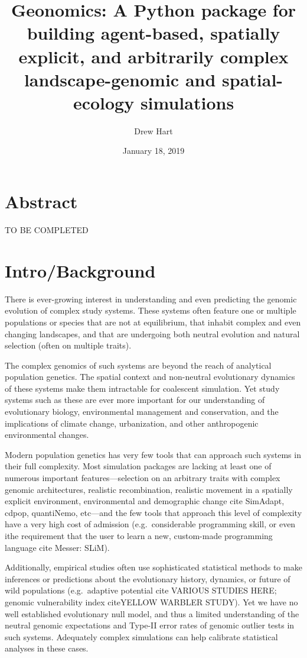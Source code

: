 ﻿\documentclass{article}
\title{Geonomics: A Python package for building agent-based, spatially explicit, and arbitrarily complex landscape-genomic and spatial-ecology simulations}
\author{Drew Hart}
\date{January 18, 2019}
\begin{document}
\maketitle

\section{Abstract}

{\LARGE TO BE COMPLETED}


\section{Intro/Background}
There is ever-growing interest in understanding and even predicting
the genomic evolution of complex study systems. 
These systems often feature one or multiple populations or species that are not
at equilibrium, that inhabit complex and even changing landscapes, and that are 
undergoing both neutral evolution and natural selection (often on multiple traits).

The complex genomics of such systems are beyond the reach of analytical
population genetics. The spatial context and non-neutral evolutionary
dynamics of these systems make them intractable for coalescent simulation.  
Yet study systems such as these are ever more important for our understanding
of evolutionary biology, environmental management and conservation, and the
implications of climate change, urbanization, and other anthropogenic
environmental changes.

Modern population genetics has very few tools that can approach
such systems in their full complexity. Most simulation packages are lacking
at least one of numerous important features---selection on an arbitrary traits
with complex genomic architectures, realistic recombination,
realistic movement in a spatially explicit environment,
environmental and demographic change 
{\large cite SimAdapt, cdpop, quantiNemo, etc}---and the few tools that approach
this level of complexity have a very high cost of admission
(e.g.\ considerable programming skill, or even ithe requirement
that the user to learn a new, custom-made programming language
{\large cite Messer: SLiM}). 

Additionally, empirical studies often use sophisticated statistical methods
to make inferences or predictions about the evolutionary history,
dynamics, or future of wild populations (e.g.\ adaptive potential
{\large cite VARIOUS STUDIES HERE}; genomic vulnerability index
{\large citeYELLOW WARBLER STUDY}). Yet we have no well established evolutionary
null model, and thus a limited understanding of the neutral genomic expectations
and Type-II error rates of genomic outlier tests in such systems. Adequately
complex simulations can help calibrate statistical analyses in these cases.
\end{document}
